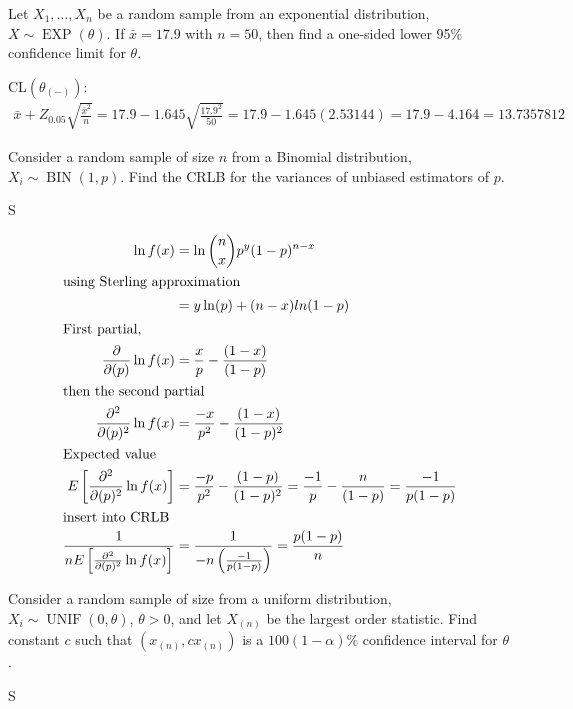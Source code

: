 \documentclass[answers]{exam}
\begin{document}
\begin{questions}
\question 
Let \(X_1,\ldots,X_n\) be a random sample from an exponential distribution,
\(X\sim\operatorname{EXP}(\theta)\). 
If \(\bar{x}=17.9\) with \(n=50\), then find a one-sided lower 95\%
confidence limit for \(\theta\).
\begin{solution}
	CL\((\theta_{(-)})\):
	\begin{align*}
		\bar{x} + Z_{0.05}\sqrt{\frac{\bar{x}^2}{n}} 
		= 17.9 - 1.645\sqrt{\frac{17.9^2}{50}} 
		= 17.9 - 1.645(2.53144)
		= 17.9 - 4.164%
		= 13.7357812
	\end{align*}
\end{solution}

\question 
Consider a random sample of size \(n\) from a Binomial distribution,
\(X_i\sim\operatorname{BIN}(1,p)\). 
Find the CRLB for the variances of unbiased estimators of \(p\).
\begin{solution}
	S
	
	\begin{align*}
		\ln f(x) &= \ln\binom{n}{x}p^y(1-p)^{n-x} \\
		\intertext{using Sterling approximation}
			&= y \ln(p) + (n-x)ln(1-p) \\
	\intertext{First partial,}
		\frac{\partial}{\partial(p)}\ln f(x) &= \frac{x}{p} -\frac{(1-x)}{(1-p)} \\
	\intertext{then the second partial}
		\frac{\partial^2}{\partial(p)^2}\ln f(x)
			&= \frac{-x}{p^2} -\frac{(1-x)}{(1-p)^2} \\
	\intertext{Expected value}
		E\left[\frac{\partial^2}{\partial(p)^2}\ln f(x)\right]
		&= \frac{-p}{p^2} -\frac{(1-p)}{(1-p)^2}
		= \frac{-1}{p} -\frac{n}{(1-p)} 
		= \frac{-1}{p(1-p)} \\
	\intertext{insert into CRLB}
		\frac{1}{nE\left[\frac{\partial^2}{\partial(p)^2}\ln f(x)\right]}
		&= \frac{1}{-n\left(\frac{-1}{p(1-p)}\right)}
		= \frac{p(1-p)}{n}
	\end{align*}
\end{solution}

\question 
Consider a random sample of size from a uniform distribution,
\(X_i\sim\operatorname{UNIF}(0,\theta)\), \(\theta>0\),
and let \(X_{(n)}\) be the largest order statistic. 
Find constant \(c\) such that \((x_{(n)},cx_{(n)})\) is a \(100(1-\alpha)\%\) 
confidence interval for \(\theta\).
\begin{solution}
	S
\end{solution}


\end{questions}
\end{document}
